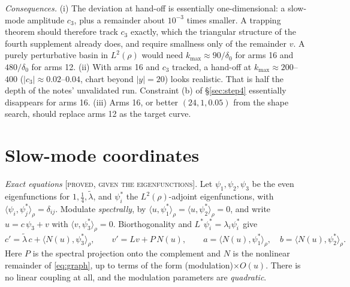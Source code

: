 \documentclass[11pt]{amsart}
\theoremstyle{remark}
\newcommand{\ip}[2]{\langle #1,#2\rangle}
\newcommand{\lab}[1]{\textup{\textsc{[#1]}}}
\begin{document}
\emph{Consequences.} (i) The deviation at hand-off is essentially one-dimensional: a slow-mode amplitude $c_3$, plus a remainder about $10^{-3}$ times smaller. A trapping theorem should therefore track $c_3$ exactly, which the triangular structure of the fourth supplement already does, and require smallness only of the remainder $v$. A purely perturbative basin in $L^2(\rho)$ would need $k_{\max}\approx90/\delta_0$ for arms 16 and $480/\delta_0$ for arms 12. (ii) With arms 16 and $c_3$ tracked, a hand-off at $k_{\max}\approx200$--$400$ ($|c_3|\approx0.02$--$0.04$, chart beyond $|y|=20$) looks realistic. That is half the depth of the notes' unvalidated run. Constraint (b) of \S\ref{sec:step4} essentially disappears for arms 16. (iii) Arms 16, or better $(24,1,0.05)$ from the shape search, should replace arms 12 as the target curve.

\section{Slow-mode coordinates}\label{sec:slow}

\emph{Exact equations} \lab{proved, given the eigenfunctions}. Let $\psi_1,\psi_2,\psi_3$ be the even eigenfunctions for $1,\frac14,\tilde\lambda$, and $\psi_i^*$ the $L^2(\rho)$-adjoint eigenfunctions, with $\ip{\psi_i}{\psi_j^*}_\rho=\delta_{ij}$. Modulate \emph{spectrally}, by $\ip{u}{\psi_1^*}_\rho=\ip{u}{\psi_2^*}_\rho=0$, and write $u=c\,\psi_3+v$ with $\ip{v}{\psi_3^*}_\rho=0$. Biorthogonality and $L^*\psi_i^*=\lambda_i\psi_i^*$ give
\[
c'=\tilde\lambda\,c+\ip{N(u)}{\psi_3^*}_\rho,\qquad v'=Lv+P\,N(u),\qquad a=\ip{N(u)}{\psi_1^*}_\rho,\quad b=\ip{N(u)}{\psi_2^*}_\rho .
\]
Here $P$ is the spectral projection onto the complement and $N$ is the nonlinear remainder of \eqref{eq:graph}, up to terms of the form (modulation)$\times O(u)$. There is no linear coupling at all, and the modulation parameters are \emph{quadratic}.
\end{document}
